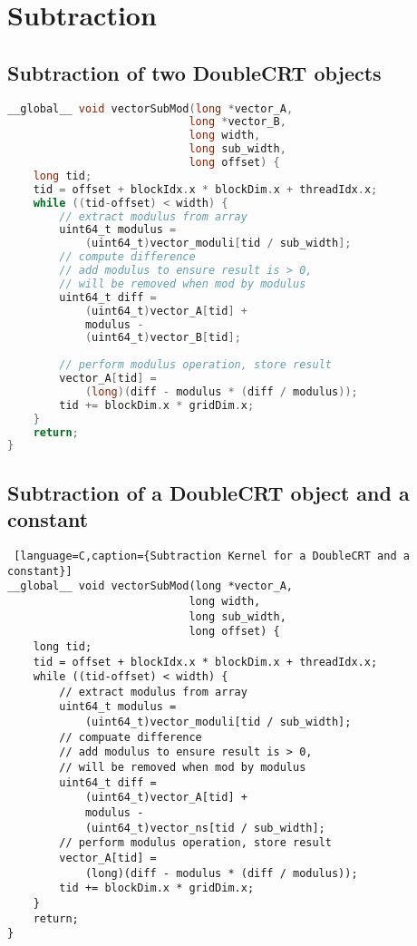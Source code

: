 \section{Subtraction} \label{sec:KernelSubtraction}
\subsection{Subtraction of two DoubleCRT objects}
\begin{lstlisting}[language=C,caption={Subtraction Kernel for Two DoubleCRT}]
__global__ void vectorSubMod(long *vector_A, 
                            long *vector_B, 
                            long width, 
                            long sub_width, 
                            long offset) {
	long tid;
	tid = offset + blockIdx.x * blockDim.x + threadIdx.x;
	while ((tid-offset) < width) {
	    // extract modulus from array
		uint64_t modulus = 
		    (uint64_t)vector_moduli[tid / sub_width];
		// compute difference
		// add modulus to ensure result is > 0, 
	    // will be removed when mod by modulus
		uint64_t diff = 
		    (uint64_t)vector_A[tid] + 
		    modulus - 
		    (uint64_t)vector_B[tid];
		
		// perform modulus operation, store result
		vector_A[tid] = 
		    (long)(diff - modulus * (diff / modulus));
		tid += blockDim.x * gridDim.x;
	}
	return;
}
\end{lstlisting}

\subsection{Subtraction of a DoubleCRT object and a constant}
\begin{lstlisting} [language=C,caption={Subtraction Kernel for a DoubleCRT and a constant}]
__global__ void vectorSubMod(long *vector_A, 
                            long width, 
                            long sub_width, 
                            long offset) {
	long tid;
	tid = offset + blockIdx.x * blockDim.x + threadIdx.x;
	while ((tid-offset) < width) {
	    // extract modulus from array
		uint64_t modulus = 
		    (uint64_t)vector_moduli[tid / sub_width];
		// compuate difference
		// add modulus to ensure result is > 0, 
		// will be removed when mod by modulus
		uint64_t diff = 
		    (uint64_t)vector_A[tid] + 
		    modulus - 
		    (uint64_t)vector_ns[tid / sub_width];
		// perform modulus operation, store result
		vector_A[tid] = 
		    (long)(diff - modulus * (diff / modulus));
		tid += blockDim.x * gridDim.x;
	}
	return;
}
\end{lstlisting}


